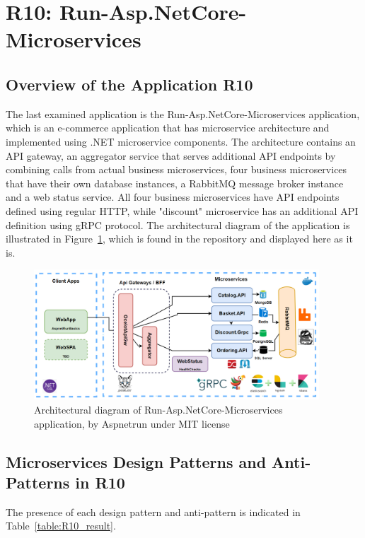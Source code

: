 \documentclass{Configuration_Files/PoliMi3i_thesis}
\begin{document}
\section{R10: Run-Asp.NetCore-Microservices}
\label{sec:R10}

\subsection{Overview of the Application R10}
\label{subsec:R10_overview}

The last examined application is the Run-Asp.NetCore-Microservices application, which is an e-commerce application that has microservice architecture and implemented using .NET microservice components.
The architecture contains an API gateway, an aggregator service that serves additional API endpoints by combining calls from actual business microservices, four business microservices that have their own database instances, a RabbitMQ message broker instance and a web status service.
All four business microservices have API endpoints defined using regular HTTP, while "discount" microservice has an additional API definition using gRPC protocol.
The architectural diagram of the application is illustrated in Figure~\ref{fig:R10_arch}, which is found in the repository and displayed here as it is.

\begin{figure}[H]
\centering
\includegraphics[width=0.95\textwidth]{myImages/R10.png}
\caption{Architectural diagram of Run-Asp.NetCore-Microservices application, by Aspnetrun under MIT license}
\label{fig:R10_arch}
\end{figure}

\subsection{Microservices Design Patterns and Anti-Patterns in R10}
\label{subsec:R10_detection}

The presence of each design pattern and anti-pattern is indicated in Table~\ref{table:R10_result}.
\end{document}
